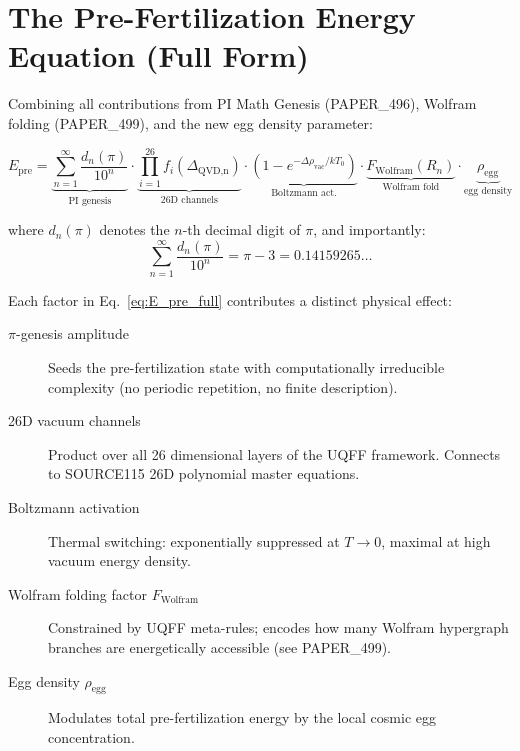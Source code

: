 \documentclass[12pt]{article}
\begin{document}
\section{The Pre-Fertilization Energy Equation (Full Form)}

Combining all contributions from PI Math Genesis (PAPER\_496), Wolfram folding
(PAPER\_499), and the new egg density parameter:

\begin{equation}
    \boxed{
    E_\text{pre} = \underbrace{\sum_{n=1}^{\infty} \frac{d_n(\pi)}{10^n}}_{\text{PI genesis}}
    \cdot \underbrace{\prod_{i=1}^{26} f_i(\Delta_\text{QVD,n})}_{\text{26D channels}}
    \cdot \underbrace{\left(1 - e^{-\Delta\rho_\text{vac}/kT_0}\right)}_{\text{Boltzmann act.}}
    \cdot \underbrace{F_\text{Wolfram}(R_n)}_{\text{Wolfram fold}}
    \cdot \underbrace{\rho_\text{egg}}_{\text{egg density}}
    }
    \label{eq:E_pre_full}
\end{equation}

where $d_n(\pi)$ denotes the $n$-th decimal digit of $\pi$, and importantly:
\[
    \sum_{n=1}^{\infty} \frac{d_n(\pi)}{10^n} = \pi - 3 = 0.14159265\ldots
\]

Each factor in Eq.~\eqref{eq:E_pre_full} contributes a distinct physical effect:

\begin{description}
    \item[$\pi$-genesis amplitude] Seeds the pre-fertilization state with
          computationally irreducible complexity (no periodic repetition,
          no finite description).
    \item[26D vacuum channels] Product over all 26 dimensional layers of the
          UQFF framework. Connects to SOURCE115 26D polynomial master equations.
    \item[Boltzmann activation] Thermal switching: exponentially suppressed
          at $T \to 0$, maximal at high vacuum energy density.
    \item[Wolfram folding factor $F_\text{Wolfram}$] Constrained by UQFF
          meta-rules; encodes how many Wolfram hypergraph branches are
          energetically accessible (see PAPER\_499).
    \item[Egg density $\rho_\text{egg}$] Modulates total pre-fertilization
          energy by the local cosmic egg concentration.
\end{description}
\end{document}
